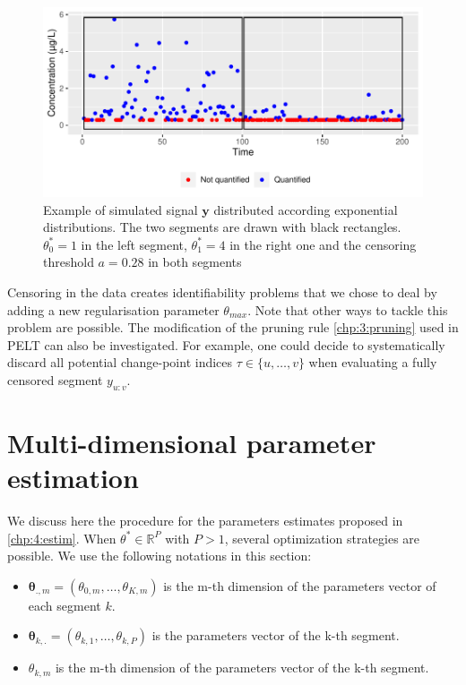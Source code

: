 \begin{figure}[ht]
    \centering
    \includegraphics{figs/Chap4/theta_max_ex.pdf}
    \caption{Example of simulated signal $\bm y$ distributed according exponential distributions. The two segments are drawn with black rectangles. $\theta^*_0 = 1$ in the left segment, $\theta^*_1 = 4$ in the right one and the censoring threshold $a = 0.28$ in both segments}
    \label{fig:theta_max}
\end{figure}

Censoring in the data creates identifiability problems that we chose to deal by adding a new regularisation parameter $\theta_{max}$. Note that other ways to tackle this problem are possible. The modification of the pruning rule \ref{chp:3:pruning} used in PELT can also be investigated. For example, one could decide to systematically discard all potential change-point indices $\tau \in \{u,\dots,v\}$ when evaluating a fully censored segment $y_{u:v}$.  

\section{Multi-dimensional parameter estimation}\label{chp:4:3}

We discuss here the procedure for the parameters estimates proposed in \ref{chp:4:estim}. When $\theta^* \in \mathbb{R}^P$ with $P > 1$, several optimization strategies are possible. We use the following notations in this section: 
\begin{itemize}
\item $\bm \theta_{.,m} = (\theta_{0,m},\dots,\theta_{K,m})$ is the m-th dimension of the parameters vector of each segment $k$.
\item $\bm \theta_{k,.} = (\theta_{k,1},\dots,\theta_{k,P})$ is the parameters vector of the k-th segment.
\item $\theta_{k,m}$ is the m-th dimension of the parameters vector of the k-th segment.
\end{itemize}

